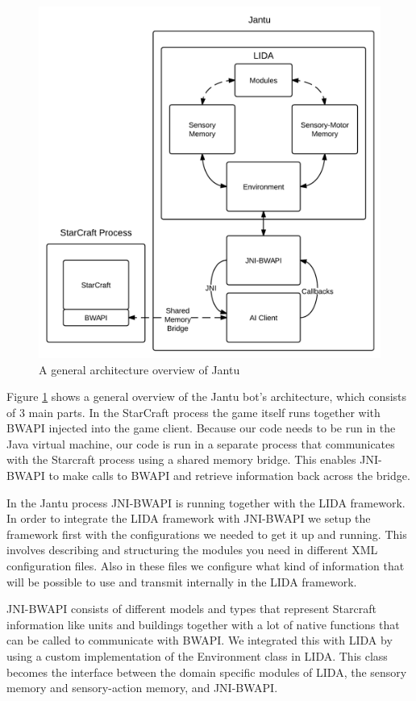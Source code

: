 \begin{figure}[h!tb]
\centering
\includegraphics[scale=1.0]{graphics/jantu.png}
\caption{A general architecture overview of Jantu}
\label{fig:jantu}
\end{figure}

Figure \ref{fig:jantu} shows a general overview of the Jantu bot's architecture, which consists of 3 main parts. In the StarCraft process the game itself runs together with BWAPI injected into the game client. Because our code needs to be run in the Java virtual machine, our code is run in a separate process that communicates with the Starcraft process using a shared memory bridge. This enables JNI-BWAPI to make calls to BWAPI and retrieve information back across the bridge.

In the Jantu process JNI-BWAPI is running together with the LIDA framework. In order to integrate the LIDA framework with JNI-BWAPI we setup the framework first with the configurations we needed to get it up and running. This involves describing and structuring the modules you need in different XML configuration files. Also in these files we configure what kind of information that will be possible to use and transmit internally in the LIDA framework.

JNI-BWAPI consists of different models and types that represent Starcraft information like units and buildings together with a lot of native functions that can be called to communicate with BWAPI. We integrated this with LIDA by using a custom implementation of the Environment class in LIDA. This class becomes the interface between the domain specific modules of LIDA, the sensory memory and sensory-action memory, and JNI-BWAPI.


